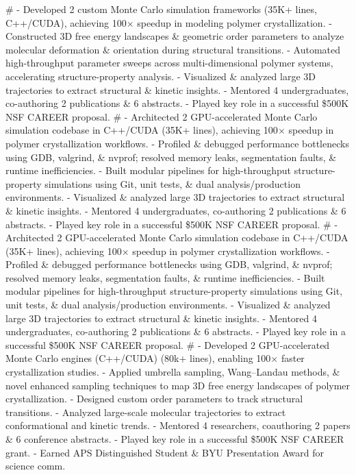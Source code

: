 #
- Developed 2 custom Monte Carlo simulation frameworks (35K+ lines, C++/CUDA), achieving 100$\times$ speedup in modeling polymer crystallization.
- Constructed 3D free energy landscapes \& geometric order parameters to analyze molecular deformation \& orientation during structural transitions.
- Automated high-throughput parameter sweeps across multi-dimensional polymer systems, accelerating structure-property analysis.
- Visualized \& analyzed large 3D trajectories to extract structural \& kinetic insights.
- Mentored 4 undergraduates, co-authoring 2 publications \& 6 abstracts.
- Played key role in a successful \$500K NSF CAREER proposal.
#
- Architected 2 GPU-accelerated Monte Carlo simulation codebase in C++/CUDA (35K+ lines), achieving 100$\times$ speedup in polymer crystallization workflows.
- Profiled \& debugged performance bottlenecks using GDB, valgrind, \& nvprof; resolved memory leaks, segmentation faults, \& runtime inefficiencies.
- Built modular pipelines for high-throughput structure-property simulations using Git, unit tests, \& dual analysis/production environments.
- Visualized \& analyzed large 3D trajectories to extract structural \& kinetic insights.
- Mentored 4 undergraduates, co-authoring 2 publications \& 6 abstracts.
- Played key role in a successful \$500K NSF CAREER proposal.
#
- Architected 2 GPU-accelerated Monte Carlo simulation codebase in C++/CUDA (35K+ lines), achieving 100$\times$ speedup in polymer crystallization workflows.
- Profiled \& debugged performance bottlenecks using GDB, valgrind, \& nvprof; resolved memory leaks, segmentation faults, \& runtime inefficiencies.
- Built modular pipelines for high-throughput structure-property simulations using Git, unit tests, \& dual analysis/production environments.
- Visualized \& analyzed large 3D trajectories to extract structural \& kinetic insights.
- Mentored 4 undergraduates, co-authoring 2 publications \& 6 abstracts.
- Played key role in a successful \$500K NSF CAREER proposal.
#
- Developed 2 GPU-accelerated Monte Carlo engines (C++/CUDA) (80k+ lines), enabling 100$\times$ faster crystallization studies.
- Applied umbrella sampling, Wang–Landau methods, \& novel enhanced sampling techniques to map 3D free energy landscapes of polymer crystallization.
- Designed custom order parameters to track structural transitions.
- Analyzed large-scale molecular trajectories to extract conformational and kinetic trends.
- Mentored 4 researchers, coauthoring 2 papers \& 6 conference abstracts.
- Played key role in a successful \$500K NSF CAREER grant.
- Earned APS Distinguished Student \& BYU Presentation Award for science comm.
